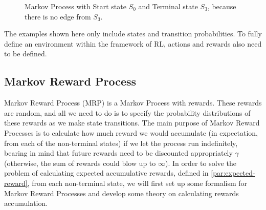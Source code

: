 \documentclass[../xlapes02]{subfiles}
\begin{document}
    \begin{figure}[h!]
        \begin{center}
            \caption{Markov Process with Start state $S_0$ and Terminal state $S_3$, because there is no edge from $S_3$.}
            \label{fig:markov-process}
        \end{center}
        \centering
    \end{figure}

    The examples shown here only include states and transition probabilities. To fully define an environment within the framework of RL, actions and rewards also need to be defined.

    \subsection{Markov Reward Process}\label{subsubsec:markov-reward-process}
    Markov Reward Process (MRP) is a Markov Process with rewards. These rewards are random, and all we need to do is to specify the probability distributions of these rewards as we make state transitions. The main purpose of Markov Reward Processes is to calculate how much reward we would accumulate (in expectation, from each of the non-terminal states) if we let the process run indefinitely, bearing in mind that future rewards need to be discounted appropriately $\gamma$ (otherwise, the sum of rewards could blow up to $\infty$). In order to solve the problem of calculating expected accumulative rewards, defined in \cref{par:expected-reward}, from each non-terminal state, we will first set up some formalism for Markov Reward Processes and develop some theory on calculating rewards accumulation.
\end{document}

